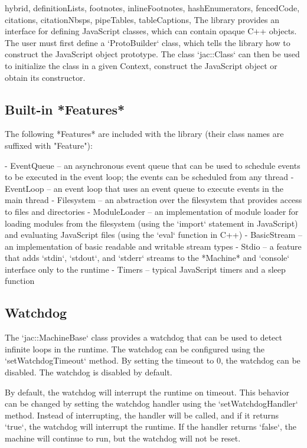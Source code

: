 \documentclass[
  digital,
  oneside,
  nosansbold,
  nocolorbold,
  lof,
  lot
]{fithesis4}
\begin{document}
\begin{markdown*}{%
  hybrid,
  definitionLists,
  footnotes,
  inlineFootnotes,
  hashEnumerators,
  fencedCode,
  citations,
  citationNbsps,
  pipeTables,
  tableCaptions,
}
The library provides an interface for defining JavaScript classes, which can contain opaque C++ objects. The user must first define a `ProtoBuilder` class, which tells the library how to construct the JavaScript object prototype. The class `jac::Class` can then be used to initialize the class in a given Context, construct the JavaScript object or obtain its constructor.

\subsection{Built-in *Features*}

The following *Features* are included with the library (their class names are suffixed with "Feature"):

  - EventQueue -- an asynchronous event queue that can be used to schedule events to be executed in the event loop; the events can be scheduled from any thread
  - EventLoop -- an event loop that uses an event queue to execute events in the main thread
  - Filesystem -- an abstraction over the filesystem that provides access to files and directories
  - ModuleLoader -- an implementation of module loader for loading modules from the filesystem (using the `import` statement in JavaScript) and evaluating JavaScript files (using the `eval` function in C++)
  - BasicStream -- an implementation of basic readable and writable stream types
  - Stdio -- a feature that adds `stdin`, `stdout`, and `stderr` streams to the *Machine* and `console` interface only to the runtime
  - Timers -- typical JavaScript timers and a sleep function

\subsection{Watchdog}

The `jac::MachineBase` class provides a watchdog that can be used to detect infinite loops in the runtime. The watchdog can be configured using the `setWatchdogTimeout` method. By setting the timeout to 0, the watchdog can be disabled. The watchdog is disabled by default.

By default, the watchdog will interrupt the runtime on timeout. This behavior can be changed by setting the watchdog handler using the `setWatchdogHandler` method. Instead of interrupting, the handler will be called, and if it returns `true`, the watchdog will interrupt the runtime. If the handler returns `false`, the machine will continue to run, but the watchdog will not be reset.



\end{markdown*}
\end{document}

